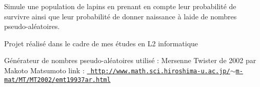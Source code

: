 Simule une population de lapins en prenant en compte leur probabilité de survivre ainsi que leur probabilité de donner naissance à l\textquotesingle{}aide de nombres pseudo-\/aléatoires.

Projet réalisé dans le cadre de mes études en L2 informatique

Générateur de nombres pseudo-\/aléatoires utilisé \+: Mersenne Twister de 2002 par Makoto Matsumoto link \+: \href{http://www.math.sci.hiroshima-u.ac.jp/~m-mat/MT/MT2002/emt19937ar.html}{\texttt{ http\+://www.\+math.\+sci.\+hiroshima-\/u.\+ac.\+jp/$\sim$m-\/mat/\+M\+T/\+M\+T2002/emt19937ar.\+html}} 